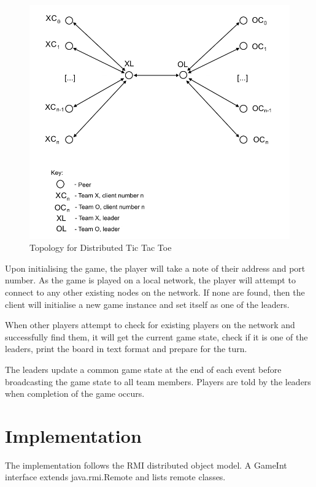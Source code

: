 \documentclass[conference]{IEEEtran}
\begin{document}
\begin{figure}[h]
	\includegraphics[width=\linewidth]{images/DAS-topology.png}
	\caption{Topology for Distributed Tic Tac Toe}
	\label{fig:topology1}
\end{figure}

Upon initialising the game, the player will take a note of their address and port number. As the game is played on a local network, the player will attempt to connect to any other existing nodes on the network. If none are found, then the client will initialise a new game instance and set itself as one of the leaders.

When other players attempt to check for existing players on the network and successfully find them, it will get the current game state, check if it is one of the leaders, print the board in text format and prepare for the turn.

The leaders update a common game state at the end of each event before broadcasting the game state to all team members. Players are told by the leaders when completion of the game occurs.

\section{Implementation}

The implementation follows the RMI distributed object model. A GameInt interface extends java.rmi.Remote and lists remote classes.
\end{document}
